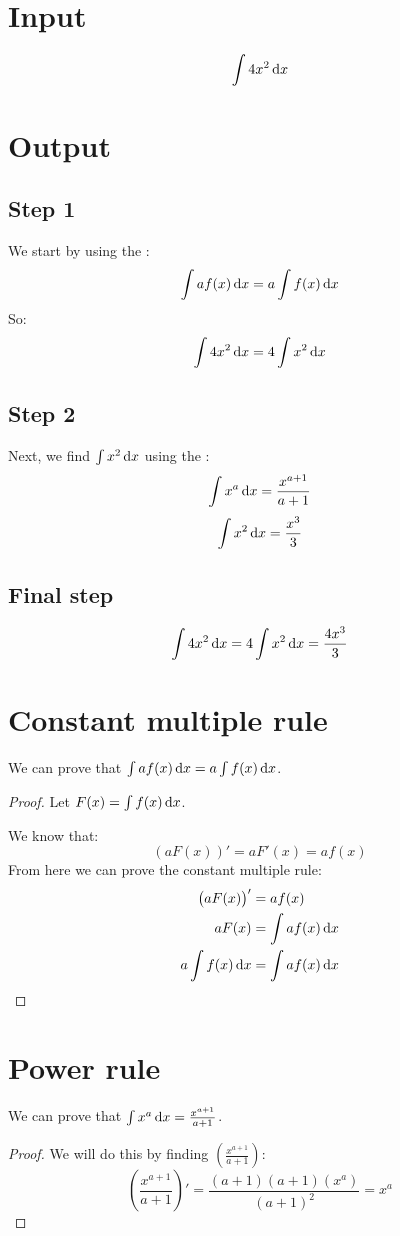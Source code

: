 \documentclass[12pt,letterpaper]{article}
\begin{document}
	\section*{Input}
		\[\int 4x^2 \dif x\]
	\section*{Output}
		\subsection*{Step 1}
			We start by using the :
			\[\int af(x) \dif x = a \int f(x) \dif x\]
			So:
			\[\int 4x^2 \dif x = 4 \int x^2 \dif x\]
		\subsection*{Step 2}
			Next, we find $\int x^2 \dif x$ using the :
			\[\int x^a \dif x = \frac{x^{a+1}}{a+1}\]
			\[\int x^2 \dif x = \frac{x^3}{3}\]
		\subsection*{Final step}
			\[\int 4x^2 \dif x = 4 \int x^2 \dif x = \frac{4x^3}{3}\]
	\newpage
	\appendix
	\section{Constant multiple rule}\label{sec:constmulrule}
		We can prove that $\int af(x) \dif x = a \int f(x) \dif x$.
		\begin{proof}
			Let $F(x) = \int f(x) \dif x$.

			We know that:
			\[\left(aF(x)\right)' = a F'(x) = a f(x)\]
			From here we can prove the constant multiple rule:
			\begin{align*}
				\left(a F(x)\right)' &= a f(x)\\
				a F(x) &= \int a f(x) \dif x\\
				a \int f(x) \dif x &= \int a f(x) \dif x
			\end{align*}
		\end{proof}
	\section{Power rule}\label{sec:powerrule}
		We can prove that $\int x^a \dif x = \frac{x^{a+1}}{a+1}$.
		\begin{proof}
			We will do this by finding $\left(\frac{x^{a+1}}{a+1}\right)$:
			\[\left(\frac{x^{a+1}}{a+1}\right)' = \frac{(a+1)(a+1)(x^a)}{(a+1)^2} = x^a\]
		\end{proof}
\end{document}
